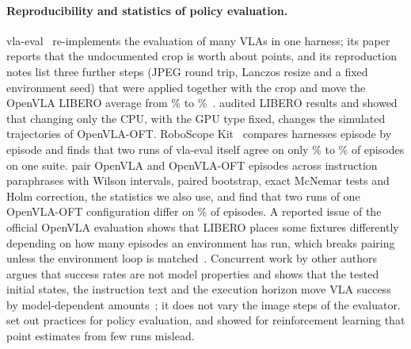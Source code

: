 \paragraph{Reproducibility and statistics of policy evaluation.} vla-eval~\citep{vlaeval} re-implements the evaluation of many VLAs in one harness; its paper reports that the undocumented crop is worth about \ExtVeCropPts{} points, and its reproduction notes list three further steps (JPEG round trip, Lanczos resize and a fixed environment seed) that were applied together with the crop and move the OpenVLA LIBERO average from \ExtVeNotesNone\% to \ExtVeNotesAll\%~\citep{vlaevalrepo}. \citet{jiang2026bench} audited LIBERO results and showed that changing only the CPU, with the GPU type fixed, changes the simulated trajectories of OpenVLA-OFT. RoboScope Kit~\citep{roboscope} compares harnesses episode by episode and finds that two runs of vla-eval itself agree on only \ExtRoboscopeSelfLo\% to \ExtRoboscopeSelfHi\% of episodes on one suite. \citet{li2026paraphrase} pair OpenVLA and OpenVLA-OFT episodes across instruction paraphrases with Wilson intervals, paired bootstrap, exact McNemar tests and Holm correction, the statistics we also use, and find that two runs of one OpenVLA-OFT configuration differ on \ExtLiRerunPct\% of episodes. A reported issue of the official OpenVLA evaluation shows that LIBERO places some fixtures differently depending on how many episodes an environment has run, which breaks pairing unless the environment loop is matched~\citep{issue342}. Concurrent work by other authors argues that success rates are not model properties and shows that the tested initial states, the instruction text and the execution horizon move VLA success by model-dependent amounts~\citep{anon2026successrates}; it does not vary the image steps of the evaluator. \citet{kressgazit2024} set out practices for policy evaluation, and \citet{agarwal2021} showed for reinforcement learning that point estimates from few runs mislead.
